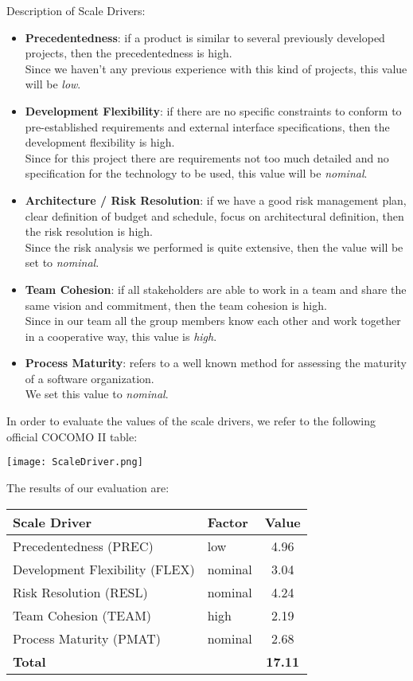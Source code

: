 Description of Scale Drivers:
\begin{itemize}
	\item \textbf{Precedentedness}: if a product is similar to several previously developed projects, then the precedentedness	is high. \\ Since we haven't any previous experience with this kind of projects, this value will be \textit{low}.
	\item \textbf{Development Flexibility}: if there are no specific constraints to conform to pre-established requirements and external interface specifications, then the development flexibility is high. \\ Since for this project there are requirements not too much detailed and no specification for the technology to be used, this value will be \textit{nominal}.
	\item \textbf{Architecture / Risk Resolution}: if we have a good risk management plan, clear definition of budget and schedule, focus on architectural definition, then the risk resolution is high. \\ Since the risk analysis we performed is quite extensive, then the value will be set to \textit{nominal}.
	\item \textbf{Team Cohesion}: if all stakeholders are able to work in a team and share the same vision and commitment, then the team cohesion is high. \\ Since in our team all the group members know each other and work together in a cooperative way, this value is \textit{high}.
	\item \textbf{Process Maturity}: refers to a well known method for assessing the maturity of a software organization. \\ We set this value to \textit{nominal}. 
\end{itemize}

In order to evaluate the values of the scale drivers, we refer to the following official COCOMO II table:
\begin{center}
	\texttt{[image: ScaleDriver.png]}
\end{center}

The results of our evaluation are:
\begin{center}
	\begin{tabular}{l l c}
		\hline
		\textbf{Scale Driver} & \textbf{Factor} & \textbf{Value} \\
		\hline
		Precedentedness (PREC) & low & 4.96 \\
		Development Flexibility (FLEX) & nominal & 3.04 \\
		Risk Resolution (RESL) & nominal & 4.24 \\
		Team Cohesion (TEAM) & high & 2.19 \\
		Process Maturity (PMAT) & nominal & 2.68 \\
		\hline
		\textbf{Total} & & \textbf{17.11} \\
		\hline
	\end{tabular}
\end{center}

